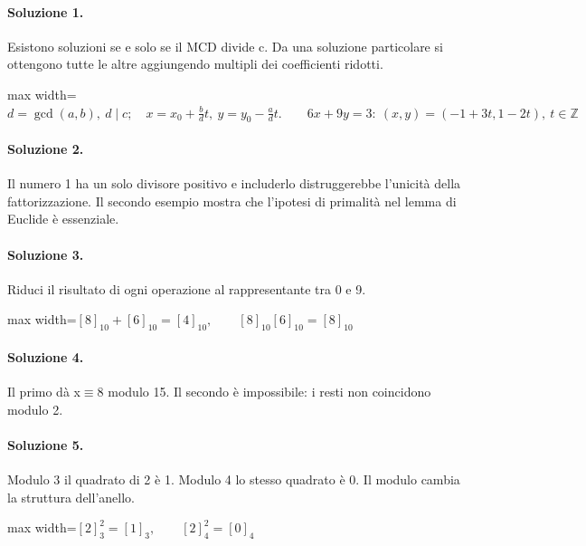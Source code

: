 \documentclass[a4paper,11pt]{article}
\begin{document}
\paragraph{Soluzione 1.} Esistono soluzioni se e solo se il MCD divide c. Da una soluzione particolare si ottengono tutte le altre aggiungendo multipli dei coefficienti ridotti.
\begin{center}\begin{adjustbox}{max width=\linewidth}$\displaystyle d=\gcd(a,b),\ d\mid c;\quad x=x_0+\frac bd t,\ y=y_0-\frac ad t.\qquad 6x+9y=3:\ (x,y)=(-1+3t,1-2t),\ t\in\mathbb Z$\end{adjustbox}\end{center}

\paragraph{Soluzione 2.} Il numero 1 ha un solo divisore positivo e includerlo distruggerebbe l’unicità della fattorizzazione. Il secondo esempio mostra che l’ipotesi di primalità nel lemma di Euclide è essenziale.

\paragraph{Soluzione 3.} Riduci il risultato di ogni operazione al rappresentante tra 0 e 9.
\begin{center}\begin{adjustbox}{max width=\linewidth}$\displaystyle [8]_{10}+[6]_{10}=[4]_{10},\qquad[8]_{10}[6]_{10}=[8]_{10}$\end{adjustbox}\end{center}

\paragraph{Soluzione 4.} Il primo dà x$\equiv$8 modulo 15. Il secondo è impossibile: i resti non coincidono modulo 2.

\paragraph{Soluzione 5.} Modulo 3 il quadrato di 2 è 1. Modulo 4 lo stesso quadrato è 0. Il modulo cambia la struttura dell’anello.
\begin{center}\begin{adjustbox}{max width=\linewidth}$\displaystyle [2]_3^2=[1]_3,\qquad[2]_4^2=[0]_4$\end{adjustbox}\end{center}
\end{document}
